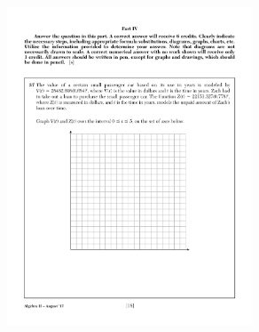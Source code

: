 \documentclass[]{book}
\begin{document}
\begin{enumerate}
\begin{figure}[!ht]
    \flushright
    \includegraphics[width=0.65\textwidth]{1stQ-grid.pdf}
\end{figure}




\end{enumerate}
\end{document}
